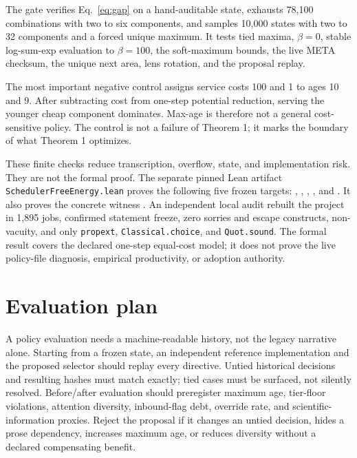\documentclass[10pt]{article}
\begin{document}
The gate verifies Eq.~\eqref{eq:gap} on a hand-auditable state, exhausts 78,100
combinations with two to six components, and samples 10,000 states with two to
32 components and a forced unique maximum.  It tests tied maxima, $\beta=0$,
stable log-sum-exp evaluation to $\beta=100$, the soft-maximum bounds, the live
META checksum, the unique next area, lens rotation, and the proposal replay.

The most important negative control assigns service costs 100 and 1 to ages 10
and 9.  After subtracting cost from one-step potential reduction, serving the
younger cheap component dominates.  Max-age is therefore not a general
cost-sensitive policy.  The control is not a failure of Theorem 1; it marks the
boundary of what Theorem 1 optimizes.

These finite checks reduce transcription, overflow, state, and implementation
risk.  They are not the formal proof.  The separate pinned Lean artifact
\texttt{SchedulerFreeEnergy.lean} proves the following five frozen targets:
,
,
,
, and
.  It also proves the concrete witness
.  An independent local audit rebuilt
the project in 1,895 jobs, confirmed statement freeze, zero sorries and escape
constructs, non-vacuity, and only \texttt{propext},
\texttt{Classical.choice}, and \texttt{Quot.sound}.  The formal result covers
the declared one-step equal-cost model; it does not prove the live policy-file
diagnosis, empirical productivity, or adoption authority.

\section{Evaluation plan}

A policy evaluation needs a machine-readable history, not the legacy narrative
alone.  Starting from a frozen state, an independent reference implementation
and the proposed selector should replay every directive.  Untied historical
decisions and resulting hashes must match exactly; tied cases must be surfaced,
not silently resolved.  Before/after evaluation should preregister maximum age,
tier-floor violations, attention diversity, inbound-flag debt, override rate,
and scientific-information proxies.  Reject the proposal if it changes an
untied decision, hides a prose dependency, increases maximum age, or reduces
diversity without a declared compensating benefit.
\end{document}
